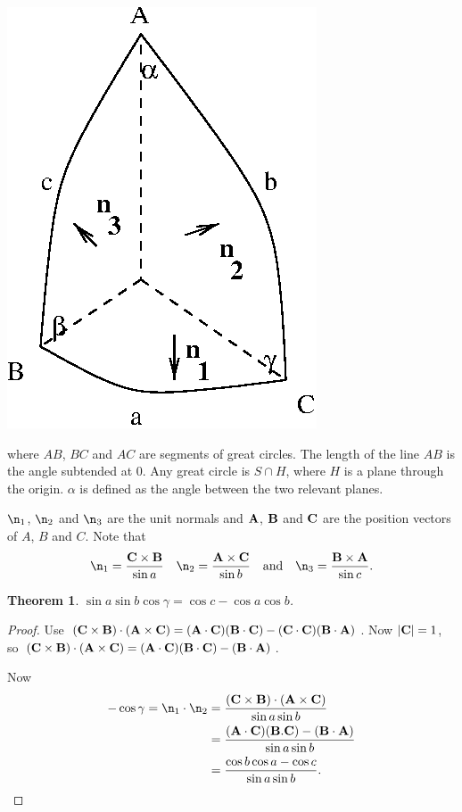\documentclass{notes}
\theoremstyle{plain}
\newtheorem{theorem}[proposition]{Theorem}
\begin{document}
\begin{center}
\includegraphics{sphtri.eps}
\end{center}

where $AB$, $BC$ and $AC$ are segments of great circles.  The length of the
line $AB$ is the angle subtended at $0$.  Any great circle is $S \cap H$, where
$H$ is a plane through the origin. $\alpha$ is defined as the angle between
the two relevant planes.

$\n_1$, $\n_2$ and $\n_3$ are the unit normals and
$\mathbf{A}$, $\mathbf{B}$ and $\mathbf{C}$ are the position vectors of $A$, $B$
and $C$.  Note that 
\begin{align*}
\n_1 = \frac{\vect{C} \times \vect{B}}{\sin a}
& &
\n_2 = \frac{\vect{A} \times \vect{C}}{\sin b}
& &\text{and} \quad
\n_3 = \frac{\vect{B} \times \vect{A}}{\sin c}.
\end{align*}

\begin{theorem}
$\sin a \sin b \cos \gamma = \cos c - \cos a \cos b$.
\end{theorem}

\begin{proof}
Use $(\mathbf{C} \times \mathbf{B}) \cdot (\mathbf{A} \times \mathbf{C})
= (\mathbf{A}\cdot\mathbf{C})(\mathbf{B} \cdot \mathbf{C})- (\mathbf{C}\cdot\mathbf{C})
(\mathbf{B}\cdot\mathbf{A})$.  Now $\left|\mathbf{C}\right| = 1$, so
$(\mathbf{C} \times \mathbf{B})\cdot(\mathbf{A} \times \mathbf{C}) =
(\mathbf{A}\cdot\mathbf{C})(\mathbf{B}\cdot\mathbf{C})- (\mathbf{B}\cdot\mathbf{A})$.

Now
\begin{align*}
-\cos \gamma = \n_1 \cdot \n_2 &=
\frac{(\vect{C} \times \vect{B})\cdot(\vect{A} \times \vect{C})}{\sin a \sin b} \\
& = \frac{(\vect{A} \cdot\vect{C})
(\vect{B}.\vect{C})- (\vect{B} \cdot \vect{A})}{\sin a \sin b} \\
& = \frac{\cos b \cos a - \cos c}{\sin a \sin b}.
\end{align*}
\end{proof}
\end{document}
